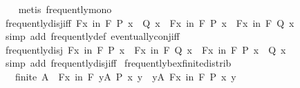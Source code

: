 \begin{isabellebody}
%
\isadelimproof
\ \ %
\endisadelimproof
%
\isatagproof
{}\isamarkupfalse%
\ {\isacharparenleft}{\kern0pt}metis\ frequently{\isacharunderscore}{\kern0pt}mono{\isacharparenright}{\kern0pt}%
\endisatagproof
{\isafoldproof}%
%
\isadelimproof
\isanewline
%
\endisadelimproof
\isanewline
{}\isamarkupfalse%
\ frequently{\isacharunderscore}{\kern0pt}disj{\isacharunderscore}{\kern0pt}iff{\isacharcolon}{\kern0pt}\ {\isachardoublequoteopen}{\isacharparenleft}{\kern0pt}{\isasymexists}\isactrlsub Fx\ in\ F{\isachardot}{\kern0pt}\ P\ x\ {\isasymor}\ Q\ x{\isacharparenright}{\kern0pt}\ {\isasymlongleftrightarrow}\ {\isacharparenleft}{\kern0pt}{\isasymexists}\isactrlsub Fx\ in\ F{\isachardot}{\kern0pt}\ P\ x{\isacharparenright}{\kern0pt}\ {\isasymor}\ {\isacharparenleft}{\kern0pt}{\isasymexists}\isactrlsub Fx\ in\ F{\isachardot}{\kern0pt}\ Q\ x{\isacharparenright}{\kern0pt}{\isachardoublequoteclose}\isanewline
%
\isadelimproof
\ \ %
\endisadelimproof
%
\isatagproof
{}\isamarkupfalse%
\ {\isacharparenleft}{\kern0pt}simp\ add{\isacharcolon}{\kern0pt}\ frequently{\isacharunderscore}{\kern0pt}def\ eventually{\isacharunderscore}{\kern0pt}conj{\isacharunderscore}{\kern0pt}iff{\isacharparenright}{\kern0pt}%
\endisatagproof
{\isafoldproof}%
%
\isadelimproof
\isanewline
%
\endisadelimproof
\isanewline
{}\isamarkupfalse%
\ frequently{\isacharunderscore}{\kern0pt}disj{\isacharcolon}{\kern0pt}\ {\isachardoublequoteopen}{\isasymexists}\isactrlsub Fx\ in\ F{\isachardot}{\kern0pt}\ P\ x\ {\isasymLongrightarrow}\ {\isasymexists}\isactrlsub Fx\ in\ F{\isachardot}{\kern0pt}\ Q\ x\ {\isasymLongrightarrow}\ {\isasymexists}\isactrlsub Fx\ in\ F{\isachardot}{\kern0pt}\ P\ x\ {\isasymor}\ Q\ x{\isachardoublequoteclose}\isanewline
%
\isadelimproof
\ \ %
\endisadelimproof
%
\isatagproof
{}\isamarkupfalse%
\ {\isacharparenleft}{\kern0pt}simp\ add{\isacharcolon}{\kern0pt}\ frequently{\isacharunderscore}{\kern0pt}disj{\isacharunderscore}{\kern0pt}iff{\isacharparenright}{\kern0pt}%
\endisatagproof
{\isafoldproof}%
%
\isadelimproof
\isanewline
%
\endisadelimproof
\isanewline
{}\isamarkupfalse%
\ frequently{\isacharunderscore}{\kern0pt}bex{\isacharunderscore}{\kern0pt}finite{\isacharunderscore}{\kern0pt}distrib{\isacharcolon}{\kern0pt}\isanewline
\ \ \ {\isachardoublequoteopen}finite\ A{\isachardoublequoteclose}\ \ {\isachardoublequoteopen}{\isacharparenleft}{\kern0pt}{\isasymexists}\isactrlsub Fx\ in\ F{\isachardot}{\kern0pt}\ {\isasymexists}y{\isasymin}A{\isachardot}{\kern0pt}\ P\ x\ y{\isacharparenright}{\kern0pt}\ {\isasymlongleftrightarrow}\ {\isacharparenleft}{\kern0pt}{\isasymexists}y{\isasymin}A{\isachardot}{\kern0pt}\ {\isasymexists}\isactrlsub Fx\ in\ F{\isachardot}{\kern0pt}\ P\ x\ y{\isacharparenright}{\kern0pt}{\isachardoublequoteclose}\isanewline

\end{isabellebody}
